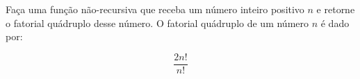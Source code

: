 
\question[10]

Faça uma função não-recursiva que receba um número inteiro positivo $n$ e retorne o fatorial quádruplo desse número. O fatorial quádruplo de um número $n$ é dado por:

\begin{equation*}
	\frac{2n!}{n!} 
\end{equation*}
